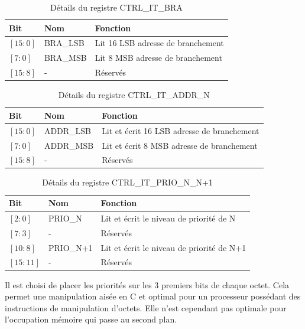 \begin{table}[H]
	\centering
	\begin{tabular}{lll}
		\toprule
		\textbf{Bit} & \textbf{Nom} & \textbf{Fonction}                 \\ \midrule
		$[15:0]$     & BRA\_LSB     & Lit 16 LSB adresse de branchement \\
		$[7:0]$      & BRA\_MSB     & Lit 8 MSB adresse de branchement  \\
		$[15:8]$     & -            & Réservés                          \\
		\bottomrule
	\end{tabular}
	\caption{Détails du registre CTRL\_IT\_BRA}
	\label{tab:reg_BRA}
\end{table}



\begin{table}[H]
	\centering
	\begin{tabular}{lll}
		\toprule
		\textbf{Bit} & \textbf{Nom} & \textbf{Fonction}                          \\ \midrule
		$[15:0]$     & ADDR\_LSB    & Lit et écrit 16 LSB adresse de branchement \\
		$[7:0]$      & ADDR\_MSB    & Lit et écrit 8 MSB adresse de branchement  \\
		$[15:8]$     & -            & Réservés                                   \\
		\bottomrule
	\end{tabular}
	\caption{Détails du registre CTRL\_IT\_ADDR\_N}
	\label{tab:reg_ADDR}
\end{table}


\begin{table}[H]
	\centering
	\begin{tabular}{lll}
		\toprule
		\textbf{Bit} & \textbf{Nom} & \textbf{Fonction}                         \\ \midrule
		$[2:0]$      & PRIO\_N      & Lit et écrit le niveau de priorité de N   \\
		$[7:3]$      & -            & Réservés                                  \\
		$[10:8]$     & PRIO\_N+1    & Lit et écrit le niveau de priorité de N+1 \\
		$[15:11]$    & -            & Réservés                                  \\
		\bottomrule
	\end{tabular}
	\caption{Détails du registre CTRL\_IT\_PRIO\_N\_N+1}
	\label{tab:reg_PRIO}
\end{table}
Il est choisi de placer les priorités sur les 3 premiers bits de chaque octet.
Cela permet une manipulation aisée en C et optimal pour un processeur possédant des instructions de manipulation d'octets.
Elle n'est cependant pas optimale pour l'occupation mémoire qui passe au second plan.




